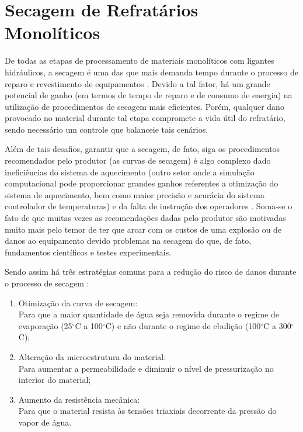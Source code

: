 \section{Secagem de Refratários Monolíticos}\label{secagem}
De todas as etapas de processamento de materiais monolíticos com ligantes
hidráulicos, a secagem é uma das que mais demanda tempo durante o processo de
reparo e revestimento de equipamentos \cite{da2015refractory}. Devido a tal
fator, há um grande potencial de ganho (em termos de tempo de reparo e de
consumo de energia) na utilização de procedimentos de secagem mais eficientes.
Porém, qualquer dano provocado no material durante tal etapa compromete a vida
útil do refratário, sendo necessário um controle que balanceie tais cenários.

Além de tais desafios, garantir que a secagem, de fato, siga os procedimentos
recomendados pelo produtor (as curvas de secagem) é algo complexo dado
ineficiências do sistema de aquecimento (outro setor onde a simulação
computacional pode proporcionar grandes ganhos referentes a otimização do
sistema de aquecimento, bem como maior precisão e acurácia do sistema
controlador de temperaturas) e da falta de instrução dos operadores
\cite{da2015refractory}. Soma-se o fato de que muitas vezes as recomendações
dadas pelo produtor são motivadas muito mais pelo temor de ter que arcar com os
custos de uma explosão ou de danos ao equipamento devido problemas na secagem do
que, de fato, fundamentos científicos e testes experimentais.

Sendo assim há três estratégias comuns para a redução do risco de danos durante
o processo de secagem \cite{da2015refractory}:

\begin{enumerate}
\item Otimização da curva de secagem: \\ Para que a maior quantidade de água
  seja removida durante o regime de evaporação (25$^{\circ}$C a 100$^{\circ}$C)
  e não durante o regime de ebulição (100$^{\circ}$C a 300$^{\circ}$C);
\item Alteração da microestrutura do material: \\ Para aumentar a permeabilidade e
  diminuir o nível de pressurização no interior do material;
\item Aumento da resistência mecânica: \\ Para que o material resista às tensões
  triaxiais decorrente da pressão do vapor de água.
\end{enumerate}

